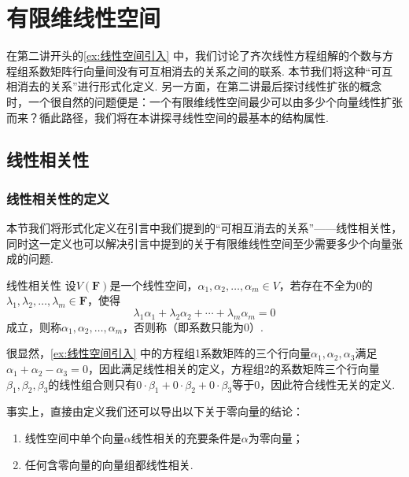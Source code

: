\chapter{有限维线性空间}

在第二讲开头的\autoref{ex:线性空间引入} 中，我们讨论了齐次线性方程组解的个数与方程组系数矩阵行向量间没有可互相消去的关系之间的联系. 本节我们将这种``可互相消去的关系''进行形式化定义. 另一方面，在第二讲最后探讨线性扩张的概念时，一个很自然的问题便是：一个有限维线性空间最少可以由多少个向量线性扩张而来？循此路径，我们将在本讲探寻线性空间的最基本的结构属性.

\section{线性相关性}

\subsection{线性相关性的定义}

本节我们将形式化定义在引言中我们提到的``可相互消去的关系''——线性相关性，同时这一定义也可以解决引言中提到的关于有限维线性空间至少需要多少个向量张成的问题.
\begin{definition}{线性相关性}{}  
    设$V(\mathbf{F})$是一个线性空间，$\alpha_1,\alpha_2,\ldots,\alpha_m\in V$，若存在不全为0的$\lambda_1,\lambda_2,\ldots,\lambda_m\in\mathbf{F}$，使得
    \[\lambda_1\alpha_1+\lambda_2\alpha_2+\cdots+\lambda_m\alpha_m=0\]
    成立，则称$\alpha_1,\alpha_2,\ldots,\alpha_m$，否则称（即系数只能为0）.
\end{definition}

很显然，\autoref{ex:线性空间引入} 中的方程组1系数矩阵的三个行向量$\alpha_1,\alpha_2,\alpha_3$满足$\alpha_1+\alpha_2-\alpha_3=0$，因此满足线性相关的定义，方程组2的系数矩阵三个行向量$\beta_1,\beta_2,\beta_3$的线性组合则只有$0\cdot\beta_1+0\cdot\beta_2+0\cdot\beta_3$等于0，因此符合线性无关的定义.

事实上，直接由定义我们还可以导出以下关于零向量的结论：
\begin{enumerate}
    \item 线性空间中单个向量$\alpha$线性相关的充要条件是$\alpha$为零向量；

    \item 任何含零向量的向量组都线性相关.
\end{enumerate}

